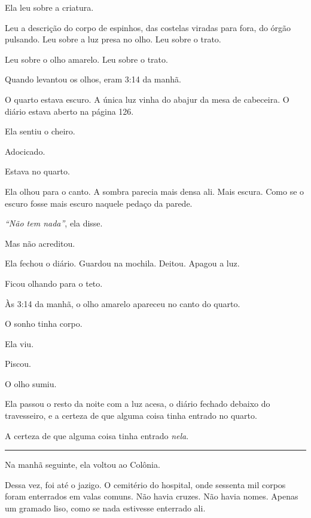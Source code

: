 \noindent Ela leu sobre a criatura.

\noindent Leu a descrição do corpo de espinhos, das costelas viradas para fora, do órgão pulsando. Leu sobre a luz presa no olho. Leu sobre o trato.

\noindent Leu sobre o olho amarelo. Leu sobre o trato.

\noindent Quando levantou os olhos, eram 3:14 da manhã.

\noindent O quarto estava escuro. A única luz vinha do abajur da mesa de cabeceira. O diário estava aberto na página 126.

\noindent Ela sentiu o cheiro.

\noindent Adocicado.

\noindent Estava no quarto.

\noindent Ela olhou para o canto. A sombra parecia mais densa ali. Mais escura. Como se o escuro fosse mais escuro naquele pedaço da parede.

\noindent \textit{\textquotedblleft{}Não tem nada\textquotedblright{}}, ela disse.

\noindent Mas não acreditou.

\noindent Ela fechou o diário. Guardou na mochila. Deitou. Apagou a luz.

\noindent Ficou olhando para o teto.

\noindent Às 3:14 da manhã, o olho amarelo apareceu no canto do quarto.

\noindent O sonho tinha corpo.

\noindent Ela viu.

\noindent Piscou.

\noindent O olho sumiu.

\noindent Ela passou o resto da noite com a luz acesa, o diário fechado debaixo do travesseiro, e a certeza de que alguma coisa tinha entrado no quarto.

\noindent A certeza de que alguma coisa tinha entrado \textit{nela}.

\vspace{0.5em}\noindent\rule{\textwidth}{0.5pt}\vspace{0.5em}

\noindent Na manhã seguinte, ela voltou ao Colônia.

\noindent Dessa vez, foi até o jazigo. O cemitério do hospital, onde sessenta mil corpos foram enterrados em valas comuns. Não havia cruzes. Não havia nomes. Apenas um gramado liso, como se nada estivesse enterrado ali.

